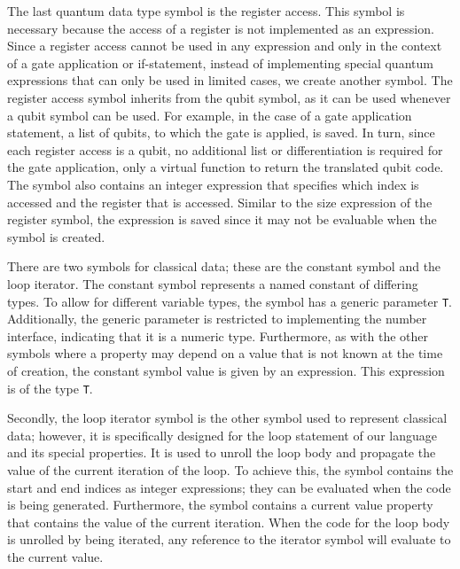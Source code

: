 The last quantum data type symbol is the register access. This symbol is necessary because the access of a register is not implemented as an expression. Since a register access cannot be used in any expression and only in the context of a gate application or if-statement, instead of implementing special quantum expressions that can only be used in limited cases, we create another symbol. The register access symbol inherits from the qubit symbol, as it can be used whenever a qubit symbol can be used. For example, in the case of a gate application statement, a list of qubits, to which the gate is applied, is saved. In turn, since each register access is a qubit, no additional list or differentiation is required for the gate application, only a virtual function to return the translated qubit code. The symbol also contains an integer expression that specifies which index is accessed and the register that is accessed. Similar to the size expression of the register symbol, the expression is saved since it may not be evaluable when the symbol is created.

There are two symbols for classical data; these are the constant symbol and the loop iterator. The constant symbol represents a named constant of differing types. To allow for different variable types, the symbol has a generic parameter \texttt{T}. Additionally, the generic parameter is restricted to implementing the number interface, indicating that it is a numeric type. Furthermore, as with the other symbols where a property may depend on a value that is not known at the time of creation, the constant symbol value is given by an expression. This expression is of the type \texttt{T}.

Secondly, the loop iterator symbol is the other symbol used to represent classical data; however, it is specifically designed for the loop statement of our language and its special properties. It is used to unroll the loop body and propagate the value of the current iteration of the loop. To achieve this, the symbol contains the start and end indices as integer expressions; they can be evaluated when the code is being generated. Furthermore, the symbol contains a current value property that contains the value of the current iteration. When the code for the loop body is unrolled by being iterated, any reference to the iterator symbol will evaluate to the current value.

